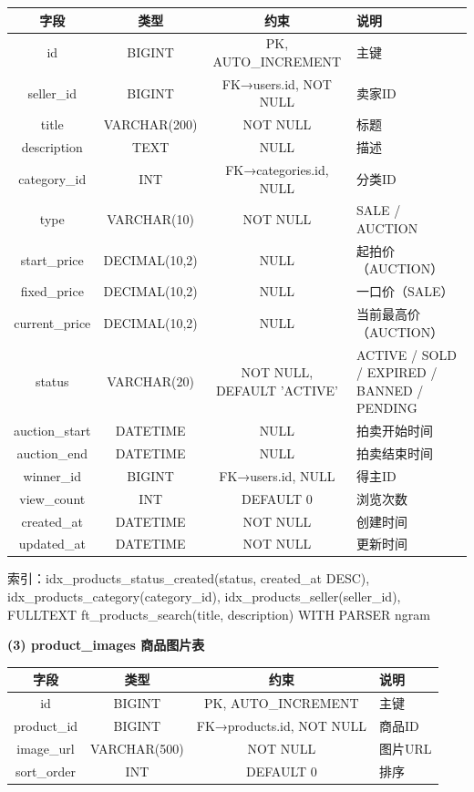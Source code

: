 \documentclass[12pt,a4paper]{ctexart}
\numberwithin{figure}{section}
\numberwithin{table}{section}
\begin{document}
\begin{center}
\renewcommand{\arraystretch}{1.3}
\small
\begin{tabular}{|c|c|c|p{6cm}|}
\hline
\rowcolor{tableheader}
\textbf{字段} & \textbf{类型} & \textbf{约束} & \textbf{说明} \\
\hline
id & BIGINT & PK, AUTO\_INCREMENT & 主键 \\
\hline
seller\_id & BIGINT & FK→users.id, NOT NULL & 卖家ID \\
\hline
title & VARCHAR(200) & NOT NULL & 标题 \\
\hline
description & TEXT & NULL & 描述 \\
\hline
category\_id & INT & FK→categories.id, NULL & 分类ID \\
\hline
type & VARCHAR(10) & NOT NULL & SALE / AUCTION \\
\hline
start\_price & DECIMAL(10,2) & NULL & 起拍价（AUCTION） \\
\hline
fixed\_price & DECIMAL(10,2) & NULL & 一口价（SALE） \\
\hline
current\_price & DECIMAL(10,2) & NULL & 当前最高价（AUCTION） \\
\hline
status & VARCHAR(20) & NOT NULL, DEFAULT 'ACTIVE' & ACTIVE / SOLD / EXPIRED / BANNED / PENDING \\
\hline
auction\_start & DATETIME & NULL & 拍卖开始时间 \\
\hline
auction\_end & DATETIME & NULL & 拍卖结束时间 \\
\hline
winner\_id & BIGINT & FK→users.id, NULL & 得主ID \\
\hline
view\_count & INT & DEFAULT 0 & 浏览次数 \\
\hline
created\_at & DATETIME & NOT NULL & 创建时间 \\
\hline
updated\_at & DATETIME & NOT NULL & 更新时间 \\
\hline
\end{tabular}
\end{center}

索引：idx\_products\_status\_created(status, created\_at DESC), idx\_products\_category(category\_id), idx\_products\_seller(seller\_id), FULLTEXT ft\_products\_search(title, description) WITH PARSER ngram

\textbf{(3) product\_images 商品图片表}

\begin{center}
\renewcommand{\arraystretch}{1.3}
\begin{tabular}{|c|c|c|p{5cm}|}
\hline
\rowcolor{tableheader}
\textbf{字段} & \textbf{类型} & \textbf{约束} & \textbf{说明} \\
\hline
id & BIGINT & PK, AUTO\_INCREMENT & 主键 \\
\hline
product\_id & BIGINT & FK→products.id, NOT NULL & 商品ID \\
\hline
image\_url & VARCHAR(500) & NOT NULL & 图片URL \\
\hline
sort\_order & INT & DEFAULT 0 & 排序 \\
\hline
\end{tabular}
\end{center}
\end{document}
